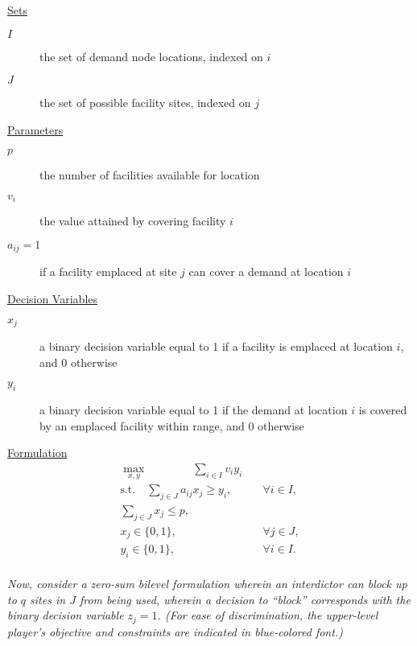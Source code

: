 \documentclass[12pt]{amsart}
\begin{document}
\begin{center}
\begin{minipage}{0.75\linewidth}
	
	\underline{Sets}
		\begin{description}
			\item[$I$] the set of demand node locations, indexed on $i$
			\item[$J$] the set of possible facility sites, indexed on $j$
		\end{description}
		
	\underline{Parameters}
		\begin{description}
			\item[$p$]  the number of facilities available for location
			\item[$v_i$] the value attained by covering facility $i$
			\item[$a_{ij}= 1$] if a facility emplaced at site $j$ can cover a demand at location $i$
		\end{description}
		
	\underline{Decision Variables}
		\begin{description}
			\item[$x_j$] a binary decision variable equal to 1 if a facility is emplaced at location $i$, and 0 otherwise
			\item[$y_i$] a binary decision variable equal to 1 if the demand at location $i$ is covered by an emplaced
			facility within range, and 0 otherwise
		\end{description}
		
	\underline{Formulation}
		\begin{align*}
			\max_{x,y} \qquad\qquad \sum_{i\in I} v_iy_i& \\
			\text{s.t.}\quad \sum_{j\in J} a_{ij}x_j \geq y_i,& \quad \forall i\in I, \\
			\sum_{j\in J} x_j \leq p,& \\
			x_j \in \{0,1\},& \quad \forall j\in J, \\
			y_i \in \{0,1\},& \quad \forall i\in I. \\
		\end{align*}
	
\textit{Now, consider a zero-sum bilevel formulation wherein an interdictor can block up to $q$ sites
	in $J$ from being used, wherein a decision to “block” corresponds with the binary decision
	variable $z_j = 1$. (For ease of discrimination, the upper-level player’s objective and
	constraints are indicated in {\color{blue} blue-colored font}.)}
	
\end{minipage}
\end{center}
\end{document}
